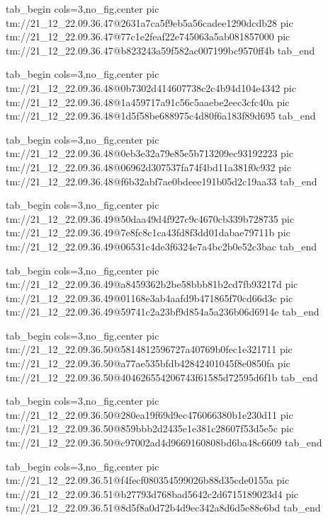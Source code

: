  
 
 
 
 

\qqSecCmtScr


\ifcmt
  tab_begin cols=3,no_fig,center
    pic tm://21_12_22.09.36.47@2631a7ca5f9eb5a56cadee1290dcdb28
    pic tm://21_12_22.09.36.47@77c1e2feaf22e745063a5ab081857000
    pic tm://21_12_22.09.36.47@b823243a59f582ac007199bc9570ff4b
  tab_end
\fi


\ifcmt
  tab_begin cols=3,no_fig,center
    pic tm://21_12_22.09.36.48@0b7302d414607738c2c4b94d104e4342
    pic tm://21_12_22.09.36.48@1a459717a91c56c5aaebe2eec3cfc40a
    pic tm://21_12_22.09.36.48@1d5f58be688975c4d80f6a183f89d695
  tab_end
\fi


\ifcmt
  tab_begin cols=3,no_fig,center
    pic tm://21_12_22.09.36.48@0eb3e32a79e85e5b713209ec93192223
    pic tm://21_12_22.09.36.48@06962d307537fa74f4bd11a381f0c932
    pic tm://21_12_22.09.36.48@f6b32abf7ae0bdeee191b05d2c19aa33
  tab_end
\fi


\ifcmt
  tab_begin cols=3,no_fig,center
    pic tm://21_12_22.09.36.49@50daa49d4f927c9c4670cb339b728735
    pic tm://21_12_22.09.36.49@7e8fc8c1ca43fd8f3dd01dabae79711b
    pic tm://21_12_22.09.36.49@06531c4de3f6324e7a4bc2b0e52c3bac
  tab_end
\fi


\ifcmt
  tab_begin cols=3,no_fig,center
    pic tm://21_12_22.09.36.49@a8459362b2be58bbb81b2cd7fb93217d
    pic tm://21_12_22.09.36.49@01168e3ab4aafd9b471865f70cd66d3c
    pic tm://21_12_22.09.36.49@59741c2a23bf9d854a5a236b06d6914e
  tab_end
\fi


\ifcmt
  tab_begin cols=3,no_fig,center
    pic tm://21_12_22.09.36.50@5814812596727a40769b0fec1e321711
    pic tm://21_12_22.09.36.50@a77ae535bfdb42842401045f8e0850fa
    pic tm://21_12_22.09.36.50@404626554206743f61585d72595d6f1b
  tab_end
\fi


\ifcmt
  tab_begin cols=3,no_fig,center
    pic tm://21_12_22.09.36.50@280ea19f69d9ec476066380b1e230d11
    pic tm://21_12_22.09.36.50@859bbb2d2435e1e381c28607f53d5e5c
    pic tm://21_12_22.09.36.50@c97002ad4d9669160808bd6ba48c6609
  tab_end
\fi


\ifcmt
  tab_begin cols=3,no_fig,center
    pic tm://21_12_22.09.36.51@f4fecf080354599026b88d35cde0155a
    pic tm://21_12_22.09.36.51@b27793d768bad5642c2d6715189023d4
    pic tm://21_12_22.09.36.51@8d5f8a0d72b4d9ec342a8d6d5e88e6bd
  tab_end
\fi


